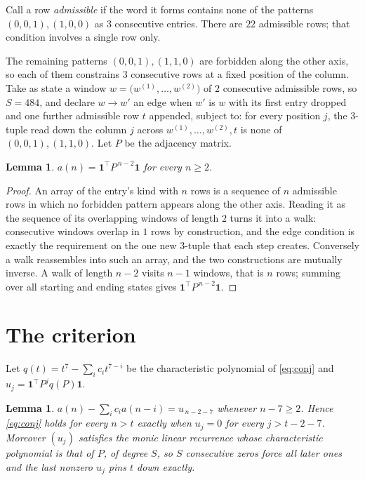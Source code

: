 \documentclass[11pt,a4paper]{article}
\theoremstyle{plain}
\newtheorem{lemma}[theorem]{Lemma}
\theoremstyle{definition}
\begin{document}
Call a row \emph{admissible} if the word it forms contains none of the patterns
$(0,0,1), (1,0,0)$ as $3$ consecutive entries. There are $22$ admissible rows; that condition
involves a single row only.

The remaining patterns $(0,0,1), (1,1,0)$ are forbidden along the other axis, so each of them
constrains $3$ consecutive rows at a fixed position of the column. Take as state a
window $w=\bigl(w^{(1)},\dots,w^{(2)}\bigr)$ of $2$ consecutive admissible
rows, so $S=484$, and declare $w\to w'$ an edge when $w'$ is $w$ with its first entry
dropped and one further admissible row $t$ appended, subject to: for every position
$j$, the $3$-tuple read down the column $j$ across $w^{(1)},\dots,w^{(2)},t$
is none of $(0,0,1), (1,1,0)$. Let $P$ be the adjacency matrix.

\begin{lemma}\label{lem:walk}
$a(n)=\mathbf{1}^{\!\top}P^{\,n-2}\mathbf{1}$ for every $n\ge2$.
\end{lemma}

\begin{proof}
An array of the entry's kind with $n$ rows is a sequence of $n$ admissible rows in
which no forbidden pattern appears along the other axis. Reading it as the sequence of its
overlapping windows of length $2$ turns it into a walk: consecutive windows overlap in
$1$ rows by construction, and the edge condition is exactly the requirement on the one
new $3$-tuple that each step creates. Conversely a walk reassembles into such an array,
and the two constructions are mutually inverse. A walk of length $n-2$ visits $n-1$
windows, that is $n$ rows; summing over all starting and ending states gives
$\mathbf{1}^{\!\top}P^{\,n-2}\mathbf{1}$.
\end{proof}

\section{The criterion}

Let $q(t)=t^{7}-\sum_i c_i t^{7-i}$ be the characteristic polynomial of
\eqref{eq:conj} and $u_j=\mathbf{1}^{\!\top}P^{j}q(P)\mathbf{1}$.

\begin{lemma}\label{lem:crit}
$a(n)-\sum_i c_i a(n-i)=u_{\,n-2-7}$ whenever $n-7\ge2$. Hence
\eqref{eq:conj} holds for every $n>t$ exactly when $u_j=0$ for every
$j>t-2-7$. Moreover $(u_j)$ satisfies the monic linear recurrence whose
characteristic polynomial is that of $P$, of degree $S$, so $S$ consecutive zeros force all
later ones and the last nonzero $u_j$ pins $t$ down exactly.
\end{lemma}
\end{document}
